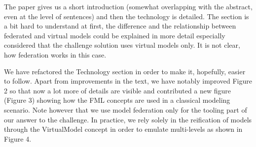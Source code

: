 \documentclass[10pt]{article}
\begin{document}
\begin{response}{The paper gives us a short introduction (somewhat overlapping with the abstract, even at the level of sentences) and then the technology is detailed. The section is a bit hard to understand at first, the difference and the relationship between federated and virtual models could be explained in more detail especially considered that the challenge solution uses virtual models only. It is not clear, how federation works in this case.}

We have refactored the Technology section in order to make it, hopefully, easier to follow. Apart from improvements in the text, we have notably improved Figure 2 so that now a lot more of details are visible and contributed a new figure (Figure 3) showing how the FML concepts are used in a classical modeling scenario. Note however that we use model federation only for the tooling part of our answer to the challenge. In practice, we rely solely in the reification of models through the \textsf{VirtualModel} concept in order to emulate multi-levels as shown in Figure 4.%
\end{response}
\end{document}
